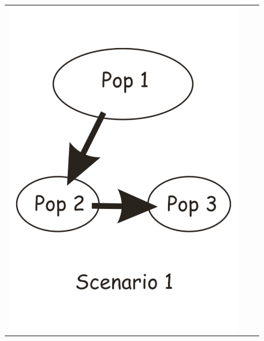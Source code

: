 \begin{figure}[h]
\begin{center}
\begin{tabular}{ccc}
\includegraphics[scale=0.2]{scenario_invasion_1.pdf} &

\end{tabular}
\end{center}
\end{figure}
